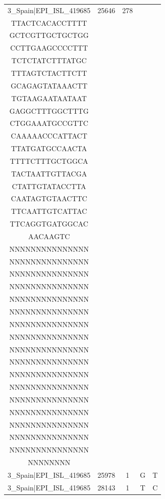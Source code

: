 \documentclass[a4paper,10pt]{article}
\begin{document}
\begin{longtable}{@{}ccccc@{}}
3\_Spain|EPI\_ISL\_419685 & 25646 & 278 & \begin{tabular}[c]{@{}c@{}}GTTGTTTGTAACAGT\\ TTACTCACACCTTTT\\ GCTCGTTGCTGCTGG\\ CCTTGAAGCCCCTTT\\ TCTCTATCTTTATGC\\ TTTAGTCTACTTCTT\\ GCAGAGTATAAACTT\\ TGTAAGAATAATAAT\\ GAGGCTTTGGCTTTG\\ CTGGAAATGCCGTTC\\ CAAAAACCCATTACT\\ TTATGATGCCAACTA\\ TTTTCTTTGCTGGCA\\ TACTAATTGTTACGA\\ CTATTGTATACCTTA\\ CAATAGTGTAACTTC\\ TTCAATTGTCATTAC\\ TTCAGGTGATGGCAC\\ AACAAGTC\end{tabular} & \begin{tabular}[c]{@{}c@{}}NNNNNNNNNNNNNNN\\ NNNNNNNNNNNNNNN\\ NNNNNNNNNNNNNNN\\ NNNNNNNNNNNNNNN\\ NNNNNNNNNNNNNNN\\ NNNNNNNNNNNNNNN\\ NNNNNNNNNNNNNNN\\ NNNNNNNNNNNNNNN\\ NNNNNNNNNNNNNNN\\ NNNNNNNNNNNNNNN\\ NNNNNNNNNNNNNNN\\ NNNNNNNNNNNNNNN\\ NNNNNNNNNNNNNNN\\ NNNNNNNNNNNNNNN\\ NNNNNNNNNNNNNNN\\ NNNNNNNNNNNNNNN\\ NNNNNNNNNNNNNNN\\ NNNNNNNNNNNNNNN\\ NNNNNNNN\end{tabular} \\* \midrule
3\_Spain|EPI\_ISL\_419685 & 25978 & 1 & G & T \\* \midrule
3\_Spain|EPI\_ISL\_419685 & 28143 & 1 & T & C \\* \midrule

\end{longtable}
\end{document}

